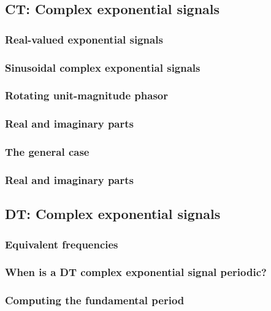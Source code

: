 \subsection{CT: Complex exponential signals}

\subsubsection{Real-valued exponential signals}

\subsubsection{Sinusoidal complex exponential signals}

\subsubsection{Rotating unit-magnitude phasor}

\subsubsection{Real and imaginary parts}

\subsubsection{The general case}

\subsubsection{Real and imaginary parts}

\subsection{DT: Complex exponential signals}

\subsubsection{Equivalent frequencies}

\subsubsection{When is a DT complex exponential signal periodic?}

\subsubsection{Computing the fundamental period}



